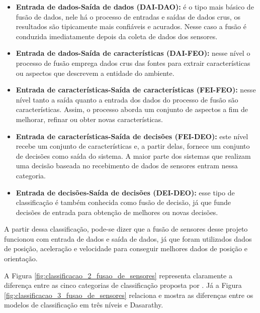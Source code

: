 \documentclass[acronym, symbols, table]{fei}
\begin{document}
				\begin{itemize}
					\item \textbf{Entrada de dados-Saída de dados (DAI-DAO):} é o tipo mais básico de fusão de dados, nele há o processo de entradas e saídas de dados crus, os resultados são tipicamente mais confiáveis e acurados. Nesse caso a fusão é conduzida imediatamente depois da coleta de dados dos sensores.
					
					\item \textbf{Entrada de dados-Saída de características (DAI-FEO):} nesse nível o processo de fusão emprega dados crus das fontes para extrair características ou aspectos que descrevem a entidade do ambiente.
					
					\item \textbf{Entrada de características-Saída de características (FEI-FEO):} nesse nível tanto a saída quanto a entrada dos dados do processo de fusão são características. Assim, o processo aborda um conjunto de aspectos a fim de melhorar, refinar ou obter novas características.
					
					\item \textbf{Entrada de características-Saída de decisões (FEI-DEO):} este nível recebe um conjunto de características e, a partir delas, fornece um conjunto de decisões como saída do sistema. A maior parte dos sistemas que realizam uma decisão baseada no recebimento de dados de sensores entram nessa categoria.
					
					\item \textbf{Entrada de decisões-Saída de decisões (DEI-DEO):} esse tipo de classificação é também conhecida como fusão de decisão, já que funde decisões de entrada para obtenção de melhores ou novas decisões.
				\end{itemize}
				
				A partir dessa classificação, pode-se dizer que a fusão de sensores desse projeto funcionou com entrada de dados e saída de dados, já que foram utilizados dados de posição, aceleração e velocidade para conseguir melhores dados de posição e orientação.
				
				A Figura \ref{fig:classificacao_2_fusao_de_sensores} representa claramente a diferença entre as cinco categorias de classificação proposta por \textcite{dasarathy1997sensor}. Já a Figura \ref{fig:classificacao_3_fusao_de_sensores} relaciona e mostra as diferenças entre os modelos de classificação em três níveis e Dasarathy.
			
\end{document}
